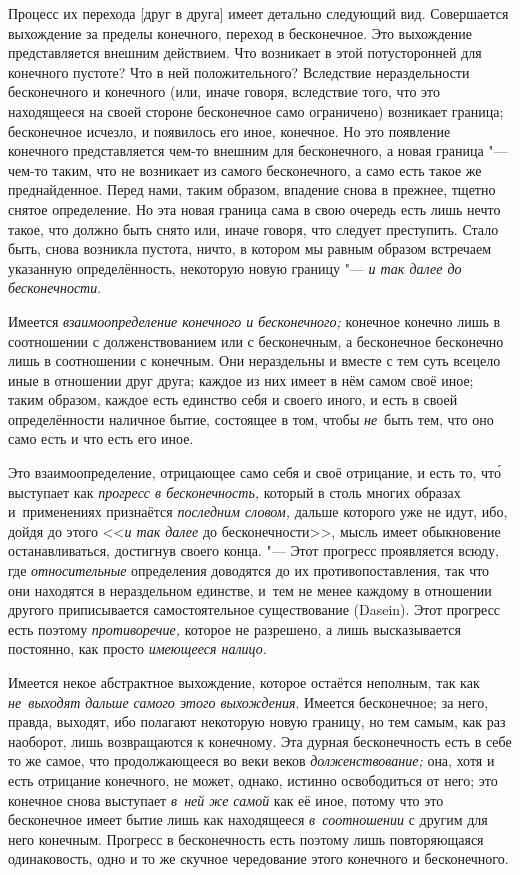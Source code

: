 Процесс их перехода [друг в друга] имеет детально следующий вид. Совершается
выхождение за пределы конечного, переход в бесконечное. Это выхождение
представляется внешним действием. Что возникает в этой потусторонней для
конечного пустоте? Что в ней положительного? Вследствие нераздельности
бесконечного и конечного (или, иначе говоря, вследствие того, что это
находящееся на своей стороне бесконечное само ограничено) возникает
граница; бесконечное исчезло, и появилось его иное, конечное. Но это
появление конечного представляется чем-то внешним для бесконечного, а
новая граница "--- чем-то таким, что не возникает из самого бесконечного, а
само есть такое же преднайденное. Перед нами, таким образом, впадение снова
в прежнее, тщетно снятое определение. Но эта новая граница сама в свою
очередь есть лишь нечто такое, что должно быть снято или, иначе говоря, что
следует преступить. Стало быть, снова возникла пустота, ничто, в котором мы
равным образом встречаем указанную определённость, некоторую новую границу
"--- {\em и так далее до бесконечности}.

Имеется {\em взаимоопределение конечного и бесконечного;} конечное конечно лишь
в соотношении с долженствованием или с бесконечным, а бесконечное бесконечно
лишь в соотношении с конечным. Они нераздельны и вместе с тем суть всецело иные
в отношении друг друга; каждое из них имеет в нём самом своё иное; таким
образом, каждое есть единство себя и своего иного, и есть в своей
определённости наличное бытие, состоящее в том, чтобы {\em не}~быть тем, что
оно само есть и что есть его иное.

Это взаимоопределение, отрицающее само себя и своё отрицание, и есть то, чт\'{о}
выступает как {\em прогресс в бесконечность,} который в столь многих образах
и~применениях признаётся {\em последним словом,} дальше которого уже не идут,
ибо, дойдя до этого <<{\em и так далее} до бесконечности>>, мысль имеет
обыкновение останавливаться, достигнув своего конца. "--- Этот прогресс
проявляется всюду, где {\em относительные} определения доводятся до их
противопоставления, так что они находятся в нераздельном единстве, и~тем не
менее каждому в отношении другого приписывается самостоятельное существование
(Dasein). Этот прогресс есть поэтому {\em противоречие,} которое не разрешено,
а лишь высказывается постоянно, как просто {\em имеющееся налицо}.

Имеется некое абстрактное выхождение, которое остаётся неполным, так как
{\em не~выходят дальше самого этого выхождения}. Имеется бесконечное; за него,
правда, выходят, ибо полагают некоторую новую границу, но тем самым, как раз
наоборот, лишь возвращаются к конечному. Эта дурная бесконечность есть в себе
то же самое, что продолжающееся во веки веков {\em долженствование;} она, хотя
и есть отрицание конечного, не может, однако, истинно освободиться от него; это
конечное снова выступает {\em в~ней же самой} как её иное, потому что это
бесконечное имеет бытие лишь как находящееся {\em в~соотношении} с другим для
него конечным. Прогресс в бесконечность есть поэтому лишь повторяющаяся
одинаковость, одно и то же скучное чередование этого конечного и бесконечного.

